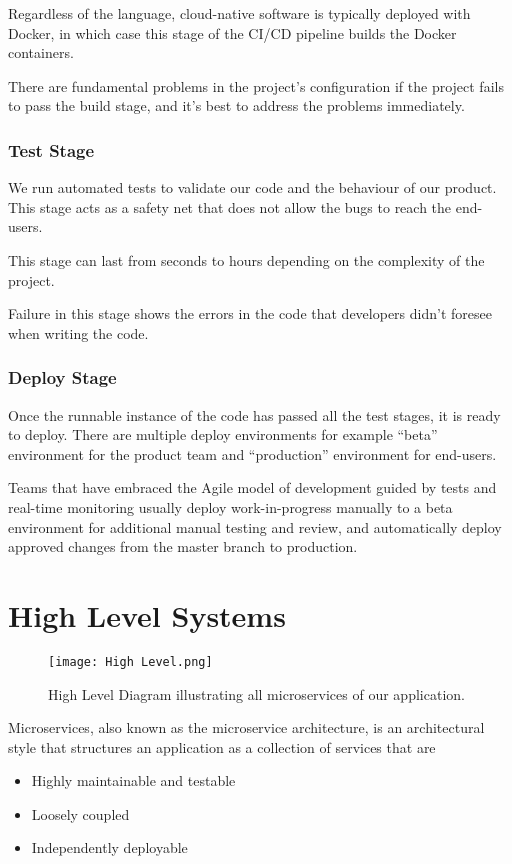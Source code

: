 Regardless of the language, cloud-native software is typically deployed with Docker, in which case this 
stage of the CI/CD pipeline builds the Docker containers.

There are fundamental problems in the project's configuration if the project fails to pass the build 
stage, and it’s best to address the problems immediately.

\subsubsection{Test Stage}
We run automated tests to validate our code and the behaviour of our product. This stage acts as a safety
net that does not allow the bugs to reach the end-users.

This stage can last from seconds to  hours depending on the complexity of the project.

Failure in this stage shows the errors in the code that developers didn't foresee when writing the code.

\subsubsection{Deploy Stage}
Once the runnable instance of the code has passed all the test stages, it is ready to deploy. There are 
multiple deploy environments for example “beta” environment for the product team and “production” 
environment for end-users.

Teams that have embraced the Agile model of development guided by tests and real-time monitoring usually 
deploy work-in-progress manually to a beta environment for additional manual testing and review, and 
automatically deploy approved changes from the master branch to production.

\section{High Level Systems}

\begin{figure}
    \centering
    \texttt{[image: High Level.png]}
    \caption{High Level Diagram illustrating all microservices of our application.}
    \label{fig:highlevel}
\end{figure}

Microservices, also known as the microservice architecture, is an architectural style that structures an 
application as a collection of services that are
\begin{itemize}
    \item Highly maintainable and testable
    \item Loosely coupled
    \item Independently deployable
\end{itemize}

